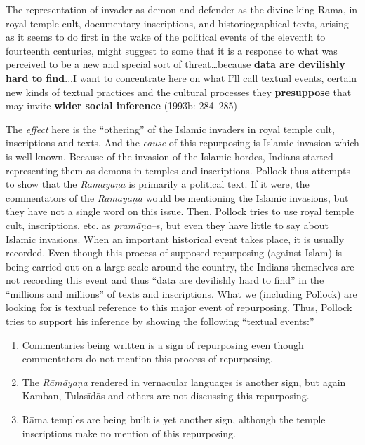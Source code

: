 \begin{myquote}
The representation of invader as demon and defender as the divine king Rama, in royal temple cult, documentary inscriptions, and historiographical texts, arising as it seems to do first in the wake of the political events of the eleventh to fourteenth centuries, might suggest to some that it is a response to what was perceived to be a new and special sort of threat…because \textbf{data are devilishly hard to find}...I want to concentrate here on what I'll call textual events, certain new kinds of textual practices and the cultural processes they \textbf{presuppose} that may invite \textbf{wider social inference} (1993b: 284–285)
\end{myquote}

The \textit{effect} here is the “othering” of the Islamic invaders in royal temple cult, inscriptions and texts. And the \textit{cause} of this repurposing is Islamic invasion which is well known. Because of the invasion of the Islamic hordes, Indians started representing them as demons in temples and inscriptions. Pollock thus attempts to show that the \textit{Rāmāyaṇa} is primarily a political text. If it were, the commentators of the \textit{Rāmāyaṇa} would be mentioning the Islamic invasions, but they have not a single word on this issue. Then, Pollock tries to use royal temple cult, inscriptions, etc. as \textit{pramāṇa}–s, but even they have little to say about Islamic invasions. When an important historical event takes place, it is usually recorded. Even though this process of supposed repurposing (against Islam) is being carried out on a large scale around the country, the Indians themselves are not recording this event and thus “data are devilishly hard to find” in the “millions and millions” of texts and inscriptions. What we (including Pollock) are looking for is textual reference to this major event of repurposing. Thus, Pollock tries to support his inference by showing the following “textual events:”

\vspace{-.3cm}

\begin{enumerate}
\itemsep=0pt
\item Commentaries being written is a sign of repurposing even though commentators do not mention this process of repurposing.

 \item The \textit{Rāmāyaṇa }rendered in vernacular languages is another sign, but again Kamban, Tulasīdās and others are not discussing this repurposing.

 \item Rāma temples are being built is yet another sign, although the temple inscriptions make no mention of this repurposing.

\end{enumerate}

